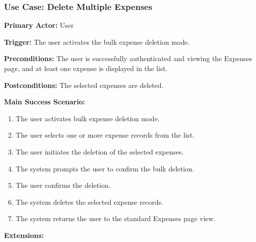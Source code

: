 \subsubsection{\textbf{Use Case: Delete Multiple Expenses}}

\textbf{Primary Actor:} User

\textbf{Trigger:} The user activates the bulk expense deletion mode.

\textbf{Preconditions:} The user is successfully authenticated and viewing the Expenses page, and at least one expense is displayed in the list.

\textbf{Postconditions:} The selected expenses are deleted.

\vspace{0.5cm}

\textbf{Main Success Scenario:}

\begin{enumerate} [leftmargin=0.75cm, noitemsep]
    \item The user activates bulk expense deletion mode.
    \item The user selects one or more expense records from the list.
    \item The user initiates the deletion of the selected expenses.
    \item The system prompts the user to confirm the bulk deletion.
    \item The user confirms the deletion.
    \item The system deletes the selected expense records.
    \item The system returns the user to the standard Expenses page view.
\end{enumerate}

\vspace{0.3cm}

\textbf{Extensions:}

